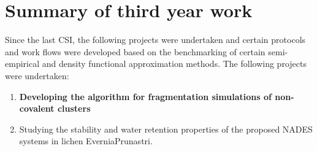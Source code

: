 \section{Summary of third year work}
Since the last CSI, the following projects were undertaken and certain protocols and work flows were developed based on the benchmarking of certain semi-empirical and density functional approximation methods. 
The following projects were undertaken:
\begin{enumerate}
    \item \textbf{Developing the algorithm for fragmentation simulations of non-covalent clusters}
    \item Studying the stability and water retention properties of the proposed NADES systems in lichen EverniaPrunastri.
\end{enumerate}